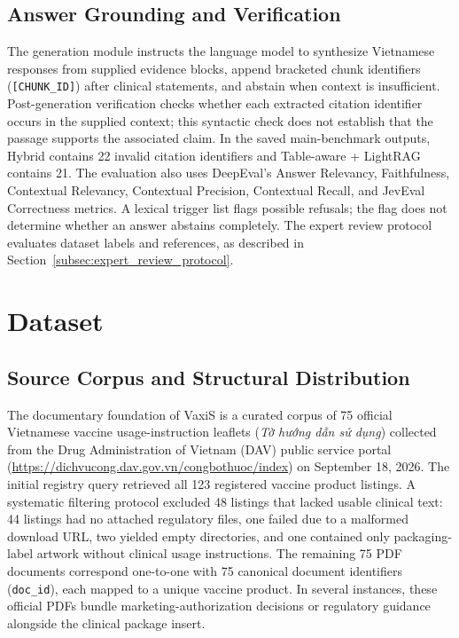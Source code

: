 \documentclass[sn-mathphys, oneside]{sn-jnl}
\newcommand{\vn}[1]{{\fontencoding{T5}\selectfont #1}}
\newcommand{\artifact}[1]{\nolinkurl{#1}}
\begin{document}
\subsection{Answer Grounding and Verification}
The generation module instructs the language model to synthesize Vietnamese responses from supplied evidence blocks, append bracketed chunk identifiers (\texttt{[CHUNK\_ID]}) after clinical statements, and abstain when context is insufficient. Post-generation verification checks whether each extracted citation identifier occurs in the supplied context; this syntactic check does not establish that the passage supports the associated claim. In the saved main-benchmark outputs, Hybrid contains 22 invalid citation identifiers and Table-aware + LightRAG contains 21. The evaluation also uses DeepEval's Answer Relevancy, Faithfulness, Contextual Relevancy, Contextual Precision, Contextual Recall, and JevEval Correctness metrics. A lexical trigger list flags possible refusals; the flag does not determine whether an answer abstains completely. The expert review protocol evaluates dataset labels and references, as described in Section~\ref{subsec:expert_review_protocol}.


\section{Dataset}
\label{sec:dataset}

\subsection{Source Corpus and Structural Distribution}
\label{subsec:corpus_distribution}
The documentary foundation of VaxiS is a curated corpus of 75 official Vietnamese vaccine usage-instruction leaflets (\emph{\vn{Tờ hướng dẫn sử dụng}}) collected from the Drug Administration of Vietnam (DAV) public service portal (\url{https://dichvucong.dav.gov.vn/congbothuoc/index}) on September 18, 2026. The initial registry query retrieved all 123 registered vaccine product listings. A systematic filtering protocol excluded 48 listings that lacked usable clinical text: 44 listings had no attached regulatory files, one failed due to a malformed download URL, two yielded empty directories, and one contained only packaging-label artwork without clinical usage instructions. The remaining 75 PDF documents correspond one-to-one with 75 canonical document identifiers (\artifact{doc_id}), each mapped to a unique vaccine product. In several instances, these official PDFs bundle marketing-authorization decisions or regulatory guidance alongside the clinical package insert.
\end{document}
